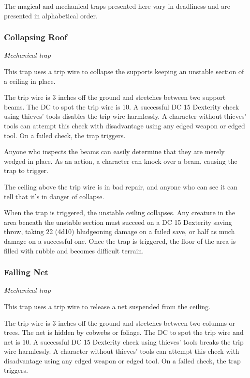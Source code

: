 \documentclass[
]{article}
\begin{document}
The magical and mechanical traps presented here vary in deadliness and
are presented in alphabetical order.

\hypertarget{collapsing-roof}{%
\subsubsection{Collapsing Roof}\label{collapsing-roof}}

\emph{Mechanical trap}

This trap uses a trip wire to collapse the supports keeping an unstable
section of a ceiling in place.

The trip wire is 3 inches off the ground and stretches between two
support beams. The DC to spot the trip wire is 10. A successful DC 15
Dexterity check using thieves' tools disables the trip wire harmlessly.
A character without thieves' tools can attempt this check with
disadvantage using any edged weapon or edged tool. On a failed check,
the trap triggers.

Anyone who inspects the beams can easily determine that they are merely
wedged in place. As an action, a character can knock over a beam,
causing the trap to trigger.

The ceiling above the trip wire is in bad repair, and anyone who can see
it can tell that it's in danger of collapse.

When the trap is triggered, the unstable ceiling collapses. Any creature
in the area beneath the unstable section must succeed on a DC 15
Dexterity saving throw, taking 22 (4d10) bludgeoning damage on a failed
save, or half as much damage on a successful one. Once the trap is
triggered, the floor of the area is filled with rubble and becomes
difficult terrain.

\hypertarget{falling-net}{%
\subsubsection{Falling Net}\label{falling-net}}

\emph{Mechanical trap}

This trap uses a trip wire to release a net suspended from the ceiling.

The trip wire is 3 inches off the ground and stretches between two
columns or trees. The net is hidden by cobwebs or foliage. The DC to
spot the trip wire and net is 10. A successful DC 15 Dexterity check
using thieves' tools breaks the trip wire harmlessly. A character
without thieves' tools can attempt this check with disadvantage using
any edged weapon or edged tool. On a failed check, the trap triggers.
\end{document}

